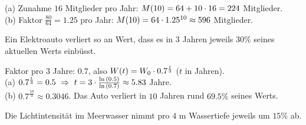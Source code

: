 \documentclass[11pt]{exam}
\begin{document}
\begin{questions}
{\begin{solution}
		(a) Zunahme $16$ Mitglieder pro Jahr: $M(10)=64+10\cdot16=224$ Mitglieder.\\
		(b) Faktor $\frac{80}{64}=1.25$ pro Jahr: $M(10)=64\cdot1.25^{10}\approx596$ Mitglieder.
\end{solution}}
{}

\question[5]
Ein Elektroauto verliert so an Wert, dass es in $3$ Jahren jeweils $30\%$ seines aktuellen Werts einbüsst.
{\begin{solution}
		Faktor pro $3$ Jahre: $0.7$, also $W(t)=W_0\cdot0.7^{\frac{t}{3}}$ ($t$ in Jahren).\\
		(a) $0.7^{\frac{t}{3}}=0.5\ \Rightarrow\ t=3\*\frac{\ln{0.5}}{\ln{0.7}}\approx5.83$ Jahre.\\
		(b) $0.7^{\frac{10}{3}}\approx0.3046$. Das Auto verliert in $10$ Jahren rund $69.5\%$ seines Werts.
\end{solution}}
{}

\question[5]
Die Lichtintensität im Meerwasser nimmt pro $4$ m Wassertiefe jeweils um $15\%$ ab.
\end{questions}
\end{document}
